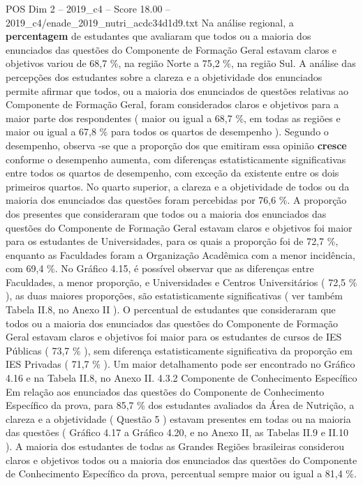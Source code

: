 \begin{textsample}{POS Dim 2 – 2019\_c4 – Score 18.00 – 2019\_c4/enade\_2019\_nutri\_acdc34d1d9.txt}
Na análise regional, a \textbf{percentagem} de estudantes que avaliaram que todos ou a maioria dos enunciados das questões do Componente de Formação Geral estavam claros e objetivos variou de 68,7 \%, na região Norte a 75,2 \%, na região Sul.
A análise das percepções dos estudantes sobre a clareza e a objetividade dos enunciados permite afirmar que todos, ou a maioria dos enunciados de questões relativas ao Componente de Formação Geral, foram considerados claros e objetivos para a maior parte dos respondentes ( maior ou igual a 68,7 \%, em todas as regiões e maior ou igual a 67,8 \% para todos os quartos de desempenho ).
Segundo o desempenho, observa -se que a proporção dos que emitiram essa opinião \textbf{cresce} conforme o desempenho aumenta, com diferenças estatisticamente significativas entre todos os quartos de desempenho, com exceção da existente entre os dois primeiros quartos.
No quarto superior, a clareza e a objetividade de todos ou da maioria dos enunciados das questões foram percebidas por 76,6 \%.
A proporção dos presentes que consideraram que todos ou a maioria dos enunciados das questões do Componente de Formação Geral estavam claros e objetivos foi maior para os estudantes de Universidades, para os quais a proporção foi de 72,7 \%, enquanto as Faculdades foram a Organização Acadêmica com a menor incidência, com 69,4 \%.
No Gráfico 4.15, é possível observar que as diferenças entre Faculdades, a menor proporção, e Universidades e Centros Universitários ( 72,5 \% ), as duas maiores proporções, são estatisticamente significativas ( ver também Tabela II.8, no Anexo II ).
O percentual de estudantes que consideraram que todos ou a maioria dos enunciados das questões do Componente de Formação Geral estavam claros e objetivos foi maior para os estudantes de cursos de IES Públicas ( 73,7 \% ), sem diferença estatisticamente significativa da proporção em IES Privadas ( 71,7 \% ).
Um maior detalhamento pode ser encontrado no Gráfico 4.16 e na Tabela II.8, no Anexo II. 4.3.2 Componente de Conhecimento Específico Em relação aos enunciados das questões do Componente de Conhecimento Específico da prova, para 85,7 \% dos estudantes avaliados da Área de Nutrição, a clareza e a objetividade ( Questão 5 ) estavam presentes em todas ou na maioria das questões ( Gráfico 4.17 a Gráfico 4.20, e no Anexo II, as Tabelas II.9 e II.10 ).
A maioria dos estudantes de todas as Grandes Regiões brasileiras considerou claros e objetivos todos ou a maioria dos enunciados das questões do Componente de Conhecimento Específico da prova, percentual sempre maior ou igual a 81,4 \%.

\end{textsample}
